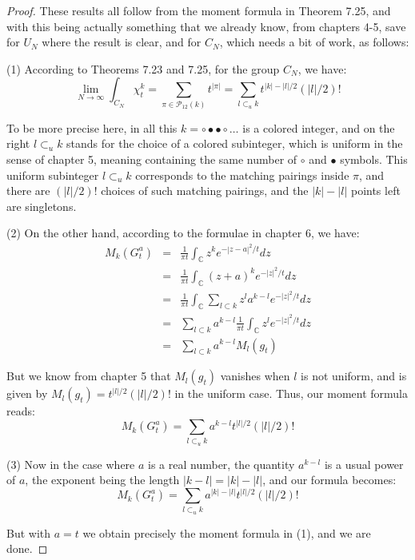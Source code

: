 \documentclass[12pt]{amsbook}
\begin{document}
\begin{proof}
These results all follow from the moment formula in Theorem 7.25, and with this being actually something that we already know, from chapters 4-5, save for $U_N$ where the result is clear, and for $C_N$, which needs a bit of work, as follows:

\medskip

(1) According to Theorems 7.23 and 7.25, for the group $C_N$, we have:
$$\lim_{N\to\infty}\int_{C_N}\chi_t^k=\sum_{\pi\in\mathcal P_{12}(k)}t^{|\pi|}
=\sum_{l\subset_u k}t^{|k|-|l|/2}(|l|/2)!$$

To be more precise here, in all this $k=\circ\bullet\bullet\circ\ldots$ is a colored integer, and on the right $l\subset_uk$ stands for the choice of a colored subinteger, which is uniform in the sense of chapter 5, meaning containing the same number of $\circ$ and $\bullet$ symbols. This uniform subinteger $l\subset_uk$ corresponds to the matching pairings inside $\pi$, and there are $(|l|/2)!$ choices of such matching pairings, and the $|k|-|l|$ points left are singletons.

\medskip

(2) On the other hand, according to the formulae in chapter 6, we have:
\begin{eqnarray*}
M_k(G_t^a)
&=&\frac{1}{\pi t}\int_\mathbb Cz^ke^{-|z-a|^2/t}dz\\
&=&\frac{1}{\pi t}\int_\mathbb C(z+a)^ke^{-|z|^2/t}dz\\
&=&\frac{1}{\pi t}\int_\mathbb C\sum_{l\subset k}z^la^{k-l}e^{-|z|^2/t}dz\\
&=&\sum_{l\subset k}a^{k-l}\frac{1}{\pi t}\int_\mathbb Cz^le^{-|z|^2/t}dz\\
&=&\sum_{l\subset k}a^{k-l}M_l(g_t)
\end{eqnarray*}

But we know from chapter 5 that $M_l(g_t)$ vanishes when $l$ is not uniform, and is given by $M_l(g_t)=t^{|l|/2}(|l|/2)!$ in the uniform case. Thus, our moment formula reads:
$$M_k(G_t^a)=\sum_{l\subset_u k}a^{k-l}t^{|l|/2}(|l|/2)!$$

(3) Now in the case where $a$ is a real number, the quantity $a^{k-l}$ is a usual power of $a$, the exponent being the length $|k-l|=|k|-|l|$, and our formula becomes:
$$M_k(G_t^a)=\sum_{l\subset_u k}a^{|k|-|l|}t^{|l|/2}(|l|/2)!$$

But with $a=t$ we obtain precisely the moment formula in (1), and we are done.
\end{proof}
\end{document}
